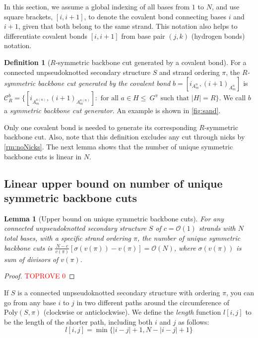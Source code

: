 \documentclass[11pt,letterpaper]{article}  \usepackage[margin=1in]{geometry}
\newtheorem{lemma}[theorem]{Lemma}
\theoremstyle{definition}  \newtheorem{Definition}[theorem]{Definition}
\newcommand{\PolySpi}{\ensuremath{\mathrm{Poly}(S,\pi)}\xspace}
\begin{document}
\begin{remark}\label{rm:noNicks}
	In this section, we assume a global indexing of all bases from $1$ to $N$, and use square brackets, $[i, i+1]$, to  denote the covalent bond connecting bases $i$ and $i +1$, given that both belong to the same strand. This notation also helps to differentiate covalent bonds $[i, i+1]$ from base pair $(j,k)$ (hydrogen bonds)  notation. 
\end{remark}

\begin{Definition}[$R$-symmetric backbone cut generated by a covalent bond]\label{def:cut}
	For  a connected unpseudoknotted secondary structure $S$ and strand ordering $\pi$, the {\em $R$-symmetric backbone cut generated by the covalent bond} $b=[i_{A_m^n}, (i+1)_{A_m^n}]$ is $\mathcal{C}_R^b = \{ [i_{A_m^{a(n)}}, ({i+1})_{A_{m}^{a(n)}}]: \textrm{ for all } a \in H \!\!\leq \!\! \!\ G^\pi \textrm{ such that } |H| = R \}$. We call $b$ a {\em symmetric backbone cut generator}. An example is shown in \cref{fig:sand}.
\end{Definition}


Only one covalent bond is needed to generate its corresponding $R$-symmetric backbone cut. Also, note that this definition excludes any cut through nicks by \cref{rm:noNicks}. The next lemma shows that the number of unique symmetric backbone cuts is linear in $N$.

\subsection{Linear upper bound on number of unique symmetric backbone cuts}

\begin{lemma}[Upper bound on unique symmetric backbone cuts]\label{lem:ub}
	For any connected unpseudoknotted secondary structure $S$ of $c=\mathcal{O}(1)$ strands with $N$ total bases, with a specific strand ordering $\pi$, the number of  unique symmetric backbone cuts is $\frac{N-c}{v(\pi)} \left[ \sigma(v(\pi))-v(\pi) \right] = \mathcal{O}(N)$, where $\sigma(v(\pi))$ is sum of divisors of $v(\pi)$. 
\end{lemma}

\begin{proof}\textcolor{red}{TOPROVE 0}\end{proof}


If $S$ is a connected unpseudoknotted secondary structure with ordering $\pi$, you can go from any base $i$ to $j$ in two different paths around the circumference of $\PolySpi$ (clockwise or anticlockwise). We define the \emph{length} function $l[i,j]$ to be the length of the shorter path, including both $i$ and $j$ as follows: 
\begin{equation}
	l[i,j] = \min \{|i-j|+1,N-|i-j|+1\}
\end{equation} 
\end{document}
